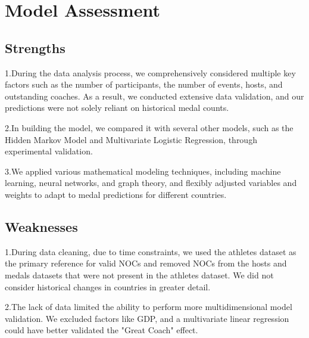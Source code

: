 \documentclass{mcmthesis}
\begin{document}
\section{Model Assessment}
\subsection{Strengths}
1.During the data analysis process, we comprehensively considered multiple key factors such as the number of participants, the number of events, hosts, and outstanding coaches. As a result, we conducted extensive data validation, and our predictions were not solely reliant on historical medal counts.

2.In building the model, we compared it with several other models, such as the Hidden Markov Model and Multivariate Logistic Regression, through experimental validation.

3.We applied various mathematical modeling techniques, including machine learning, neural networks, and graph theory, and flexibly adjusted variables and weights to adapt to medal predictions for different countries.
\subsection{Weaknesses}
1.During data cleaning, due to time constraints, we used the athletes dataset as the primary reference for valid NOCs and removed NOCs from the hosts and medals datasets that were not present in the athletes dataset. We did not consider historical changes in countries in greater detail.

2.The lack of data limited the ability to perform more multidimensional model validation. We excluded factors like GDP, and a multivariate linear regression could have better validated the "Great Coach" effect.
\end{document}
